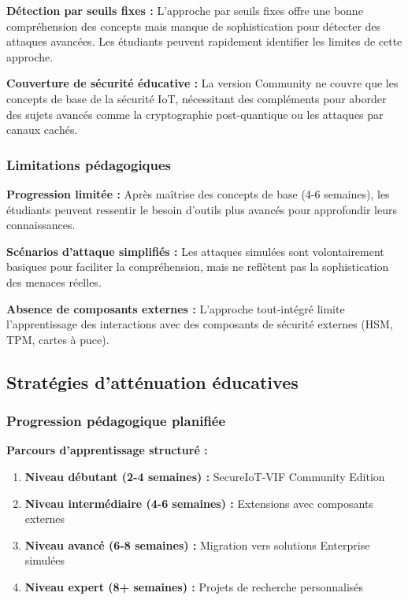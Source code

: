 \begin{itemize}
\begin{table}[h]
\begin{table}[h]
\begin{table}[h]
\begin{itemize}
\begin{table}[h]
\begin{table}[h]
\textbf{Détection par seuils fixes :} L'approche par seuils fixes offre une bonne compréhension des concepts mais manque de sophistication pour détecter des attaques avancées. Les étudiants peuvent rapidement identifier les limites de cette approche.

\textbf{Couverture de sécurité éducative :} La version Community ne couvre que les concepts de base de la sécurité IoT, nécessitant des compléments pour aborder des sujets avancés comme la cryptographie post-quantique ou les attaques par canaux cachés.

\subsubsection{Limitations pédagogiques}

\textbf{Progression limitée :} Après maîtrise des concepts de base (4-6 semaines), les étudiants peuvent ressentir le besoin d'outils plus avancés pour approfondir leurs connaissances.

\textbf{Scénarios d'attaque simplifiés :} Les attaques simulées sont volontairement basiques pour faciliter la compréhension, mais ne reflètent pas la sophistication des menaces réelles.

\textbf{Absence de composants externes :} L'approche tout-intégré limite l'apprentissage des interactions avec des composants de sécurité externes (HSM, TPM, cartes à puce).

\subsection{Stratégies d'atténuation éducatives}

\subsubsection{Progression pédagogique planifiée}

\textbf{Parcours d'apprentissage structuré :}
\begin{enumerate}
    \item \textbf{Niveau débutant (2-4 semaines) :} SecureIoT-VIF Community Edition
    \item \textbf{Niveau intermédiaire (4-6 semaines) :} Extensions avec composants externes
    \item \textbf{Niveau avancé (6-8 semaines) :} Migration vers solutions Enterprise simulées
    \item \textbf{Niveau expert (8+ semaines) :} Projets de recherche personnalisés
\end{enumerate}


\end{table}
\end{table}
\end{itemize}
\end{table}
\end{table}
\end{table}
\end{itemize}
